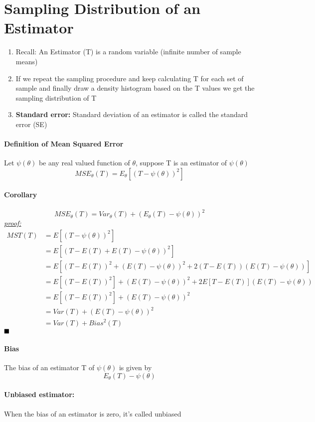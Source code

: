 \documentclass[11pt]{article}
\newcommand{\tb}[1]{\textbf{#1}}
\newcommand{\proof}[0]{\textit{\underline{proof: }}}
\newcommand{\qed}[0]{$\hfill\blacksquare$}
\begin{document}
\section{Sampling Distribution of an Estimator}
\begin{enumerate}
	\item Recall: An Estimator (T) is a random variable (infinite number of sample means)
	\item If we repeat the sampling procedure and keep calculating T for each set of sample and finally draw a density histogram based on the T values we get the sampling distribution of T
	\item \tb{Standard error:} Standard deviation of an estimator is called the standard error (SE)
\end{enumerate}

\paragraph{Definition of Mean Squared Error}
Let $\psi(\theta)$ be any real valued function of $\theta$, suppose T is an estimator of $\psi(\theta)$
$$MSE_\theta(T) = E_\theta[(T - \psi(\theta))^2]$$
\paragraph{Corollary}
$$MSE_\theta(T) = Var_\theta(T) + (E_\theta(T) - \psi(\theta))^2$$
\proof
\begin{align*}
	MST(T) &= E[(T - \psi({\theta}))^2] \\
	&= E[(T - E(T) + E(T) - \psi({\theta}))^2] \\
	&= E[(T - E(T))^2 + (E(T) - \psi({\theta}))^2 + 2(T-E(T))(E(T)-\psi({\theta}))] \\
	&= E[(T - E(T))^2] + (E(T) - \psi({\theta}))^2 +  2E[T-E(T)](E(T)-\psi({\theta}))\\
	&= E[(T - E(T))^2] + (E(T) - \psi({\theta}))^2 \\
	&= Var(T) + (E(T) - \psi({\theta}))^2\\
	&= Var(T) + Bias^2(T)
\end{align*}\qed

\paragraph{Bias} The bias of an estimator T of $\psi(\theta)$ is given by $$E_\theta(T) - \psi(\theta)$$
\paragraph{Unbiased estimator:} When the bias of an estimator is zero, it's called unbiased
\end{document}
